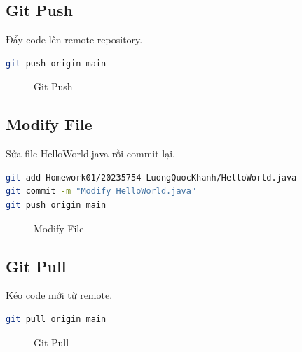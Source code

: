 \documentclass[12pt,a4paper]{article}
\begin{document}
\subsection{Git Push}
Đẩy code lên remote repository.

\begin{lstlisting}[language=bash]
git push origin main
\end{lstlisting}

\begin{figure}[H]
    \centering
    \caption{Git Push}
\end{figure}

\subsection{Modify File}
Sửa file HelloWorld.java rồi commit lại.

\begin{lstlisting}[language=bash]
git add Homework01/20235754-LuongQuocKhanh/HelloWorld.java
git commit -m "Modify HelloWorld.java"
git push origin main
\end{lstlisting}

\begin{figure}[H]
    \centering
    \caption{Modify File}
\end{figure}

\subsection{Git Pull}
Kéo code mới từ remote.

\begin{lstlisting}[language=bash]
git pull origin main
\end{lstlisting}

\begin{figure}[H]
    \centering
    \caption{Git Pull}
\end{figure}
\end{document}
